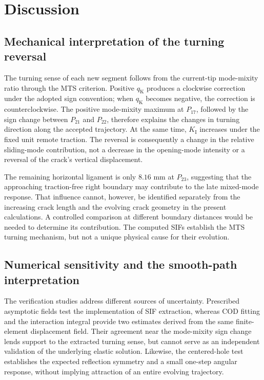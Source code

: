 \documentclass[11pt]{article}
\newcommand{\LastLigamentMM}{8.16}
\begin{document}
\section{Discussion}
\label{sec:discussion}
\subsection{Mechanical interpretation of the turning reversal}
The turning sense of each new segment follows from the current-tip
mode-mixity ratio through the MTS criterion. Positive
$q_{\mathrm{K}}$ produces a clockwise correction under the adopted
sign convention; when $q_{\mathrm{K}}$ becomes negative, the correction
is counterclockwise. The positive mode-mixity maximum at $P_{17}$,
followed by the sign change between $P_{21}$ and $P_{22}$, therefore
explains the changes in turning direction along the accepted
trajectory. At the same time, $K_{\mathrm{I}}$ increases under the
fixed unit remote traction. The reversal is consequently a change in
the relative sliding-mode contribution, not a decrease in the
opening-mode intensity or a reversal of the crack's vertical
displacement.

The remaining horizontal ligament is only $\LastLigamentMM$ mm at
$P_{23}$, suggesting that the approaching traction-free right
boundary may contribute to the late mixed-mode response. That
influence cannot, however, be identified separately from the
increasing crack length and the evolving crack geometry in the
present calculations. A controlled comparison at different
boundary distances would be needed to determine its contribution.
The computed SIFs establish the MTS turning mechanism, but not
a unique physical cause for their evolution.

\subsection{Numerical sensitivity and the smooth-path interpretation}
The verification studies address different sources of uncertainty.
Prescribed asymptotic fields test the implementation of SIF
extraction, whereas COD fitting and the interaction integral
provide two estimates derived from the same finite-element
displacement field. Their agreement near the mode-mixity sign
change lends support to the extracted turning sense, but cannot
serve as an independent validation of the underlying elastic
solution. Likewise, the centered-hole test establishes the
expected reflection symmetry and a small one-step angular
response, without implying attraction of an entire evolving
trajectory.
\end{document}
